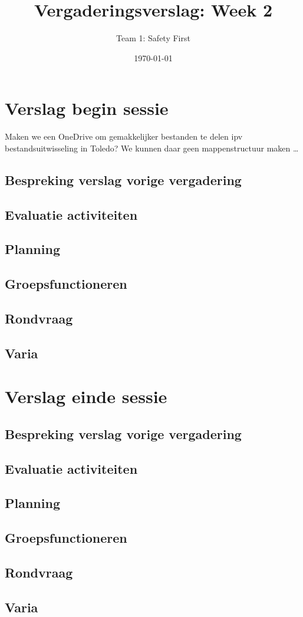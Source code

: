 \documentclass[a4paper,kulak]{kulakarticle} %
\date{\today}
\title{Vergaderingsverslag: Week 2}
\author{Team 1: Safety First}
\begin{document}
\maketitle

\section{Verslag begin sessie}
Maken we een OneDrive om gemakkelijker bestanden te delen ipv bestandsuitwisseling in Toledo? We kunnen daar geen mappenstructuur maken \ldots
\subsection{Bespreking verslag vorige vergadering}

\subsection{Evaluatie activiteiten}

\subsection{Planning}

\subsection{Groepsfunctioneren}

\subsection{Rondvraag}

\subsection{Varia}




\section{Verslag einde sessie}

\subsection{Bespreking verslag vorige vergadering}

\subsection{Evaluatie activiteiten}

\subsection{Planning}

\subsection{Groepsfunctioneren}

\subsection{Rondvraag}

\subsection{Varia}
\end{document}
